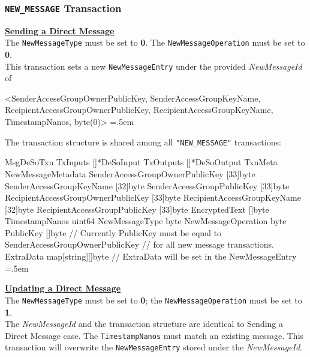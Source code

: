 \documentclass[oneside, 12pt]{article}
\newenvironment{lcverbatim}
 {\SaveVerbatim{cverb}}
 {\endSaveVerbatim
  \flushleft\fboxrule=0pt\fboxsep=.5em
  \colorbox{cverbbg}{%
    \makebox[\dimexpr\linewidth-2\fboxsep][l]{\BUseVerbatim{cverb}}%
  }
  \endflushleft
}
\begin{document}
\subsubsection{\texttt{NEW\_MESSAGE} Transaction}

\noindent\underline{\textbf{Sending a Direct Message}}\\
The \texttt{NewMessageType} must be set to \textbf{0}. The \texttt{NewMessageOperation} must be set to \textbf{0}.\\
This transaction sets a new \texttt{NewMessageEntry} under the provided \textit{NewMessageId} of

\begin{scriptsize}
\begin{lcverbatim}
<SenderAccessGroupOwnerPublicKey, SenderAccessGroupKeyName, RecipientAccessGroupOwnerPublicKey,
 RecipientAccessGroupKeyName, TimestampNanos, byte(0)>
\end{lcverbatim}
\end{scriptsize}

\noindent The transaction structure is shared among all \texttt{"NEW\_MESSAGE"} transactions:

\begin{lcverbatim}
MsgDeSoTxn
{
    TxInputs  []*DeSoInput
    TxOutputs []*DeSoOutput
    TxnMeta   NewMessageMetadata {
        SenderAccessGroupOwnerPublicKey    [33]byte
        SenderAccessGroupKeyName           [32]byte
        SenderAccessGroupPublicKey         [33]byte
        RecipientAccessGroupOwnerPublicKey [33]byte
        RecipientAccessGroupKeyName        [32]byte
        RecipientAccessGroupPublicKey      [33]byte
        EncryptedText                      []byte
        TimestampNanos                     uint64
        NewMessageType                     byte
        NewMessageOperation                byte
    }
    PublicKey []byte
        // Currently PublicKey must be equal to SenderAccessGroupOwnerPublicKey
        // for all new message transactions.
    ExtraData map[string][]byte
        // ExtraData will be set in the NewMessageEntry
}
\end{lcverbatim}

\noindent\underline{\textbf{Updating a Direct Message}}\\
The \texttt{NewMessageType} must be set to \textbf{0}; the \texttt{NewMessageOperation} must be set to \textbf{1}.\\
The \textit{NewMessageId} and the transaction structure are identical to Sending a Direct Message case. The \texttt{TimestampNanos} must match an existing message. This transaction will overwrite the \texttt{NewMessageEntry} stored under the \textit{NewMessageId}.\\
\end{document}
